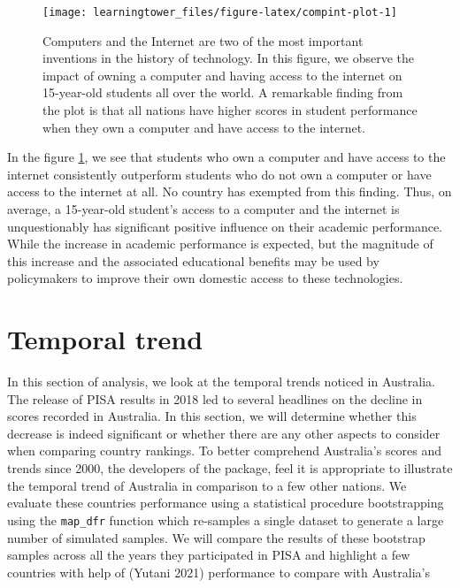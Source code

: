 \begin{figure}[H]
\texttt{[image: learningtower\_files/figure-latex/compint-plot-1]} \caption{Computers and the Internet are two of the most important inventions in the history of technology. In this figure, we observe the impact of owning a computer and having access to the internet on 15-year-old students all over the world. A remarkable finding from the plot is that all nations have higher scores in student performance when they own a computer and have access to the internet.}\label{fig:compint-plot}
\end{figure}

In the figure \ref{fig:compint-plot}, we see that students who own a computer and have access to the internet consistently outperform students who do not own a computer or have access to the internet at all. No country has exempted from this finding. Thus, on average, a 15-year-old student's access to a computer and the internet is unquestionably has significant positive influence on their academic performance. While the increase in academic performance is expected, but the magnitude of this increase and the associated educational benefits may be used by policymakers to improve their own domestic access to these technologies.

\hypertarget{temporal-trend}{%
\section{Temporal trend}\label{temporal-trend}}

In this section of analysis, we look at the temporal trends noticed in Australia. The release of PISA results in 2018 led to several headlines on the decline in scores recorded in Australia. In this section, we will determine whether this decrease is indeed significant or whether there are any other aspects to consider when comparing country rankings. To better comprehend Australia's scores and trends since 2000, the developers of the  package, feel it is appropriate to illustrate the temporal trend of Australia in comparison to a few other nations. We evaluate these countries performance using a statistical procedure bootstrapping using the \texttt{map\_dfr} function which re-samples a single dataset to generate a large number of simulated samples. We will compare the results of these bootstrap samples across all the years they participated in PISA and highlight a few countries with help of  (Yutani 2021) performance to compare with Australia's

